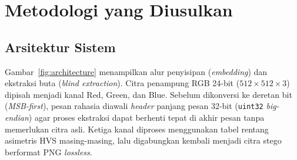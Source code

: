 \documentclass[12pt,journal]{IEEEtran}
\begin{document}
\begin{table}[t]
\centering
\caption{Posisi Riset dan Perbandingan Celah Penelitian}
\label{tab:research_gap}
\footnotesize
\setlength{\tabcolsep}{5pt}
\end{table}

\FloatBarrier

\section{Metodologi yang Diusulkan}

\subsection{Arsitektur Sistem}
Gambar~\ref{fig:architecture} menampilkan alur penyisipan (\textit{embedding}) dan ekstraksi buta (\textit{blind extraction}). Citra penampung RGB 24-bit ($512 \times 512 \times 3$) dipisah menjadi kanal Red, Green, dan Blue. Sebelum dikonversi ke deretan bit (\textit{MSB-first}), pesan rahasia diawali \textit{header} panjang pesan 32-bit (\texttt{uint32} \textit{big-endian}) agar proses ekstraksi dapat berhenti tepat di akhir pesan tanpa memerlukan citra asli. Ketiga kanal diproses menggunakan tabel rentang asimetris HVS masing-masing, lalu digabungkan kembali menjadi citra stego berformat PNG \textit{lossless}.
\end{document}
